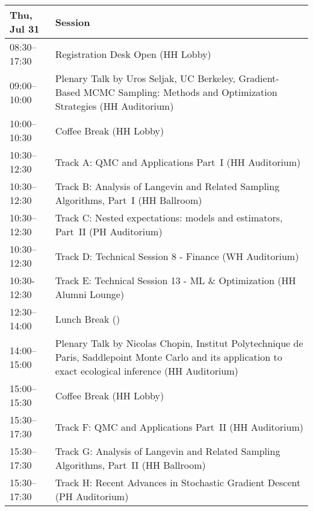 \begin{table}
{\footnotesize
\begin{tabularx}{\textwidth}{>{\hsize=0.32\hsize}X|>{\hsize=1.7\hsize}X}
\hline
\textbf{Thu, Jul 31} & \textbf{Session} \\
\hline
\cellcolor{\EmptyColor}08:30–17:30 & \cellcolor{\EmptyColor}Registration Desk Open (HH Lobby) \\
\cellcolor{\PlenaryColor}09:00–10:00 & \cellcolor{\PlenaryColor}Plenary Talk by Uros Seljak, UC Berkeley, Gradient-Based MCMC Sampling: Methods and Optimization Strategies (HH Auditorium) \\
\cellcolor{\EmptyColor}10:00–10:30 & \cellcolor{\EmptyColor}Coffee Break (HH Lobby) \\
\cellcolor{\SessionTitleColor}10:30–12:30 & \cellcolor{\SessionTitleColor}Track A: QMC and Applications Part~I (HH Auditorium) \\
\cellcolor{\SessionTitleColor}10:30–12:30 & \cellcolor{\SessionTitleColor}Track B: Analysis of Langevin and Related Sampling Algorithms, Part~I (HH Ballroom) \\
\cellcolor{\SessionTitleColor}10:30–12:30 & \cellcolor{\SessionTitleColor}Track C: Nested expectations: models and estimators, Part~II (PH Auditorium) \\
\cellcolor{\SessionLightColor}10:30–12:30 & \cellcolor{\SessionLightColor}Track D: Technical Session 8 - Finance (WH Auditorium) \\
\cellcolor{\SessionLightColor}10:30-12:30 & \cellcolor{\SessionLightColor}Track E: Technical Session 13 - ML \& Optimization (HH Alumni Lounge) \\
\cellcolor{\EmptyColor}12:30–14:00 & \cellcolor{\EmptyColor}Lunch Break () \\
\cellcolor{\PlenaryColor}14:00–15:00 & \cellcolor{\PlenaryColor}Plenary Talk by Nicolas Chopin, Institut Polytechnique de Paris, Saddlepoint Monte Carlo and its application to exact ecological inference (HH Auditorium) \\
\cellcolor{\EmptyColor}15:00–15:30 & \cellcolor{\EmptyColor}Coffee Break (HH Lobby) \\
\cellcolor{\SessionTitleColor}15:30–17:30 & \cellcolor{\SessionTitleColor}Track F: QMC and Applications Part~II (HH Auditorium) \\
\cellcolor{\SessionTitleColor}15:30–17:30 & \cellcolor{\SessionTitleColor}Track G: Analysis of Langevin and Related Sampling Algorithms, Part~II (HH Ballroom) \\
\cellcolor{\SessionTitleColor}15:30–17:30 & \cellcolor{\SessionTitleColor}Track H: Recent Advances in Stochastic Gradient Descent (PH Auditorium) \\

\end{tabularx}}
\end{table}
